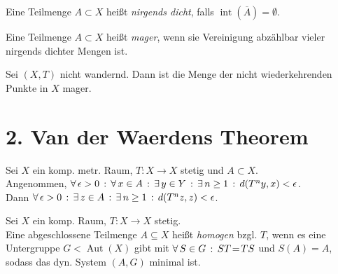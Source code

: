 \documentclass{cheat-sheet}
\DeclareMathOperator{\Aut}{Aut} %
\newcommand{\clos}[1]{\overline{#1}} %
\DeclareMathOperator{\inte}{int} %
\begin{document}

\begin{defn}
  Eine Teilmenge $A \!\subset\! X$  heißt \emph{nirgends dicht}, falls $\inte(\clos{A}) = \emptyset$.
\end{defn}

\begin{defn}
  Eine Teilmenge $A \!\subset\! X$ heißt \emph{mager}, wenn sie Vereinigung abzählbar vieler nirgends dichter Mengen ist.
\end{defn}

\begin{thm}
  Sei $(X, T)$ nicht wandernd. Dann ist die Menge der nicht wiederkehrenden Punkte in $X$ mager.
\end{thm}



\section{2. Van der Waerdens Theorem}



\begin{lem} %
  Sei $X$ ein komp. metr. Raum, $T \!:\! X \!\to\! X$ stetig und $A \!\subset\! X$. \\
  Angenommen, $\forall \, {\epsilon > 0} \,:\, \forall \, {x \in A} \,:\, \exists \, {y \in Y} \,:\, \exists \, {n \geq 1} \,:\, d(T^n y, x) < \epsilon$. \\
  Dann $\forall \, {\epsilon > 0} \,:\, \exists \, {z \in A} \,:\, \exists \, {n \geq 1} \,:\, d(T^n z, z) < \epsilon$.
\end{lem}

\begin{defn}
  Sei $X$ ein komp. Raum, $T : X \to X$ stetig. \\
  Eine abgeschlossene Teilmenge $A \subseteq X$ heißt \emph{homogen} bzgl. $T$, wenn es eine Untergruppe $G \!<\! \Aut(X)$ gibt mit $\forall \, {S \in G} \,:\, ST \!=\! TS$ und $S(A) \!=\! A$, sodass das dyn. System $(A, G)$ minimal ist.
\end{defn}
\end{document}
